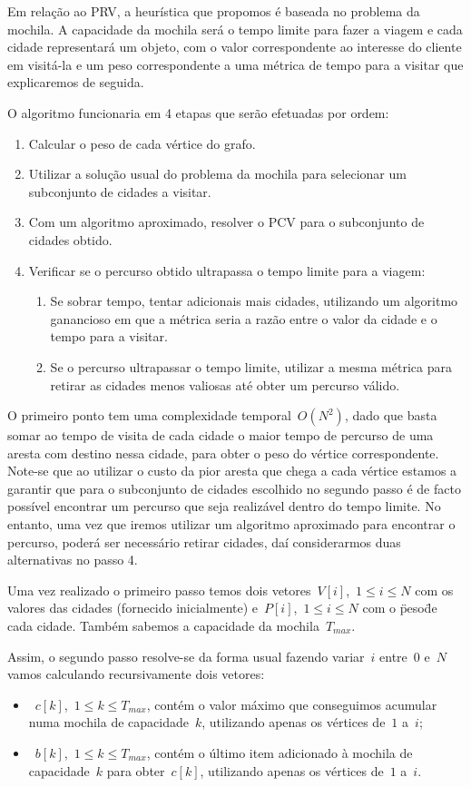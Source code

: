 \documentclass[12pt,a4paper,reqno]{report}
\numberwithin{figure}{section}
\numberwithin{equation}{section}
\begin{document}
Em relação ao PRV, a heurística que propomos é baseada no problema da mochila. A capacidade da mochila será o tempo limite para fazer a viagem e cada cidade representará um objeto, com o valor correspondente ao interesse do cliente em visitá-la e um peso correspondente a uma métrica de tempo para a visitar que explicaremos de seguida.

O algoritmo funcionaria em 4 etapas que serão efetuadas por ordem:
\begin{enumerate}
	\item Calcular o peso de cada vértice do grafo.
	\item Utilizar a solução usual do problema da mochila para selecionar um subconjunto de cidades a visitar.
	\item Com um algoritmo aproximado, resolver o PCV para o subconjunto de cidades obtido.
	\item Verificar se o percurso obtido ultrapassa o tempo limite para a viagem:
	\begin{enumerate}[label*=\arabic*.]
		\item Se sobrar tempo, tentar adicionais mais cidades, utilizando um algoritmo ganancioso em que a métrica seria a razão entre o valor da cidade e o tempo para a visitar.
		\item Se o percurso ultrapassar o tempo limite, utilizar a mesma métrica para retirar as cidades menos valiosas até obter um percurso válido.
	\end{enumerate}
\end{enumerate}

O primeiro ponto tem uma complexidade temporal~$O(N^2)$, dado que basta somar ao tempo de visita de cada cidade o maior tempo de percurso de uma aresta com destino nessa cidade, para obter o peso do vértice correspondente. Note-se que ao utilizar o custo da pior aresta que chega a cada vértice estamos a garantir que para o subconjunto de cidades escolhido no segundo passo é de facto possível encontrar um percurso que seja realizável dentro do tempo limite. No entanto, uma vez que iremos utilizar um algoritmo aproximado para encontrar o percurso, poderá ser necessário retirar cidades, daí considerarmos duas alternativas no passo 4.

Uma vez realizado o primeiro passo temos dois vetores~$V[i]$,~$1 \leq i \leq N$ com os valores das cidades (fornecido inicialmente) e~$P[i]$,~$1 \leq i \leq N$ com o \"peso\" de cada cidade. Também sabemos a capacidade da mochila~$T_{max}$. 

Assim, o segundo passo resolve-se da forma usual fazendo variar~$i$ entre~$0$ e~$N$ vamos calculando recursivamente dois vetores:
\begin{itemize}
	\item~$c[k]$,~$1 \leq k \leq T_{max}$, contém o valor máximo que conseguimos acumular numa mochila de capacidade~$k$, utilizando apenas os vértices de~$1$ a~$i$;
	\item~$b[k]$,~$1 \leq k \leq T_{max}$, contém o último item adicionado à mochila de capacidade~$k$ para obter~$c[k]$, utilizando apenas os vértices de~$1$ a~$i$.
\end{itemize}
\end{document}
